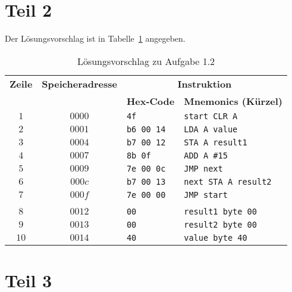 \section{Teil 2}

Der Lösungsvorschlag ist in Tabelle~\ref{tab:speicherinstruktionen} angegeben.

\begin{table}[h!]
    \setlength{\tabcolsep}{0.5em}
    \def\arraystretch{1.5}
    \centering
    \begin{tabular}{|c|c|l|l|}
        \hline
        \textbf{Zeile} & \textbf{Speicheradresse} & \multicolumn{2}{c|}{\textbf{Instruktion}} \\
        \cline{3-4}
        &                          & \textbf{Hex-Code} & \textbf{Mnemonics (Kürzel)} \\
        \hline
        $1$ & $0000$ & \texttt{4f} & \texttt{start CLR A}  \\

        $2$ & $0001$ & \texttt{b6 00 14} & \qquad\quad\texttt{LDA A value}  \\

        $3$ & $0004$ & \texttt{b7 00 12} & \qquad\quad\texttt{STA A result1}  \\

        $4$ & $0007$ & \texttt{8b 0f} & \qquad\quad\texttt{ADD A \#15}  \\

        $5$ & $0009$ & \texttt{7e 00 0c} & \qquad\quad\texttt{JMP next}  \\

        $6$ & $000c$ & \texttt{b7 00 13} & \texttt{next STA A result2}  \\

        $7$ & $000f$ & \texttt{7e 00 00} & \qquad\quad\texttt{JMP start}\\
        &&&\\
        $8$ & $0012$ & \texttt{00} & \texttt{result1 byte 00}  \\
        $9$ & $0013$ & \texttt{00} & \texttt{result2 byte 00}  \\
        $10$ & $0014$ & \texttt{40} & \texttt{value byte 40}  \\

        \hline
    \end{tabular}
    \caption{Lösungsvorschlag zu Aufgabe 1.2}
    \label{tab:speicherinstruktionen}
\end{table}


\section{Teil 3}

